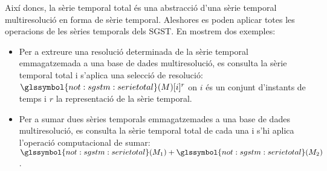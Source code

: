 Així doncs, la sèrie temporal total és una abstracció d'una sèrie
temporal multiresolució en forma de sèrie temporal. Aleshores es poden
aplicar totes les operacions de les sèries temporals dels
\gls{SGST}. En mostrem dos exemples:
\begin{itemize}
\item Per a extreure una resolució determinada de la sèrie temporal
  emmagatzemada a una base de dades multiresolució, es consulta la
  sèrie temporal total i s'aplica una selecció de resolució:
  $\glssymbol{not:sgstm:serietotal}(M)[i]^r$ on $i$ és un conjunt
  d'instants de temps i $r$ la representació de la sèrie temporal.

\item Per a sumar dues sèries temporals emmagatzemades a una base de
  dades multiresolució, es consulta la sèrie temporal total de cada
  una i s'hi aplica l'operació computacional de sumar:
  $\glssymbol{not:sgstm:serietotal}(M_1)+\glssymbol{not:sgstm:serietotal}(M_2)$.

\end{itemize}






